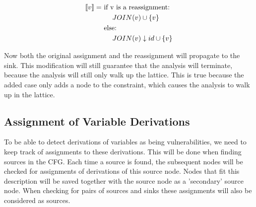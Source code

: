 \begin{align*}
  \llbracket v \rrbracket = &\text{ if v is a reassignment:}\\
  &\phantom{==}JOIN(v) \cup \{ v \}\\
  &\text{ else:}\\
  &\phantom{==}JOIN(v) \downarrow id \cup \{ v \}\\
\end{align*}

Now both the original assignment and the reassignment will propagate to the sink.
This modification will still guarantee that the analysis will terminate, because the analysis will still only walk up the lattice.
This is true because the added case only adds a node to the constraint, which causes the analysis to walk up in the lattice.

\subsection{Assignment of Variable Derivations}\label{ext:derivation}
To be able to detect derivations of variables as being vulnerabilities, we need to keep track of assignments to these derivations.
This will be done when finding sources in the CFG.
Each time a source is found, the subsequent nodes will be checked for assignments of derivations of this source node.
Nodes that fit this description will be saved together with the source node as a 'secondary' source node.
When checking for pairs of sources and sinks these assignments will also be considered as sources.
